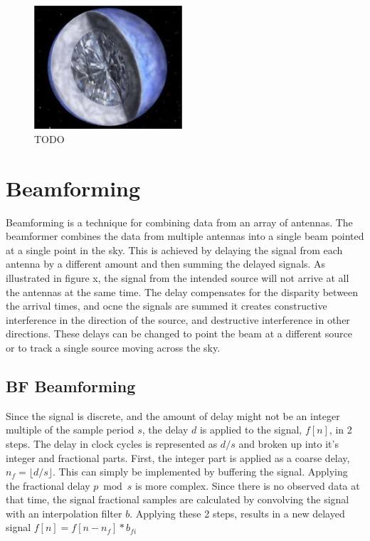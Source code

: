 \begin{figure}
  \centering
    \includegraphics[width=0.49\textwidth]{Images/C2/diamond_planet.png}
  \caption{TODO}
  \label{fig: C2/diamond_planet.png}
\end{figure}

\cite{Bailes:2011iy}

\section{Beamforming}
\label{Real Time Radio Astronomy Algorithms:Beamforming}
Beamforming is a technique for combining data from an array of antennas.
The beamformer combines the data from multiple antennas into a single beam pointed at a single point in the sky.
This is achieved by delaying the signal from each antenna by a different amount and then summing the delayed signals. 
As illustrated in figure x, %
the signal from the intended source will not arrive at all the antennas at the same time. 
The delay compensates for the disparity between the arrival times, and ocne the signals are summed it creates constructive interference in the direction of the source, and destructive interference in other directions. 
These delays can be changed to point the beam at a different source or to track a single source moving across the sky.


\subsection{BF Beamforming}
Since the signal is discrete, and the amount of delay might not be an integer multiple of the sample period $s$, the delay $d$ is applied to the signal, $f[n]$, in 2 steps. 
The delay in clock cycles is represented as $d/s$ and broken up into it's integer and fractional parts. 
First, the integer part is applied as a coarse delay, $n_f = \lfloor d/s \rfloor$. 
This can simply be implemented by buffering the signal.
Applying the  fractional delay $p \bmod s$ is more complex. 
Since there is no observed data at that time, the signal fractional samples are calculated by convolving the signal with an interpolation filter $b$.
Applying these 2 steps, results in a new delayed signal $f[n] = f[n-n_f]\ast b_{fi}$


